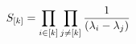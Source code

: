 \begin{equation}
S_{[k]} = \prod_{i\in [k]}\prod_{j\neq [k]} {1\over (\lambda_{i} -\lambda_j)}
\label{defSk}
\end{equation}

